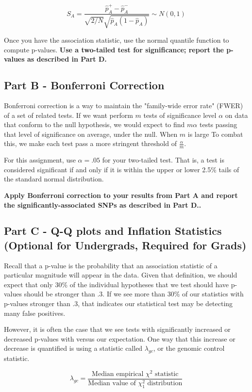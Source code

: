 \documentclass{article}
\begin{document}
$$ S_A = \frac{\hat p^+_A - \hat p^-_A}{\sqrt{2/N}\sqrt{\hat p_A(1 - \hat p_A)}} \sim N(0,1)$$

Once you have the association statistic, use the normal
quantile function to compute p-values. \textbf{Use a two-tailed test for
significance; report the p-values as described in Part D.}


\subsection*{Part B - Bonferroni Correction}
Bonferroni correction is a way to maintain the "family-wide error rate"
(FWER) of a set of related tests.
If we want perform $m$ tests of significance level $\alpha$ on 
data that conform to the null hypothesis, we would expect to find $m\alpha$ tests
passing that level of significance on average, under the null.  When $m$ is large
To combat this, we make each test pass a more
stringent threshold of $\frac{\alpha}{m}$.

For this assignment, use $\alpha = .05$ for your two-tailed test. That is, 
a test is considered significant if and only if it is within the upper
or lower 2.5\% tails of the standard normal distribution.

\textbf{Apply Bonferroni correction to your results from Part A
and report the significantly-associated SNPs as described in Part D..}

\vspace{1.5 cm}

\subsection*{Part C - Q-Q plots and Inflation Statistics (Optional for Undergrads, Required for Grads)}
Recall that a p-value is the probability that an association statistic
of a particular magnitude will appear in the data. Given that definition,
we should expect that only 30\% of the individual hypotheses
that we test should have p-values should be stronger than .3. 
If we see more than 30\% of our statistics with p-values stronger than .3,
that indicates our statistical test may be detecting many false positives.

However, it is often the case that we see tests with significantly
increased or decreased p-values with versus our expectation. One way
that this increase or decrease is quantified is using 
a statistic called $\lambda_{gc}$, or the genomic control statistic.

$$\lambda_{gc} = \frac{\text{Median empirical } \chi^2 \text{ statistic}}{\text{Median value of }\chi^2_1 \text{ distribution}}$$
\end{document}
